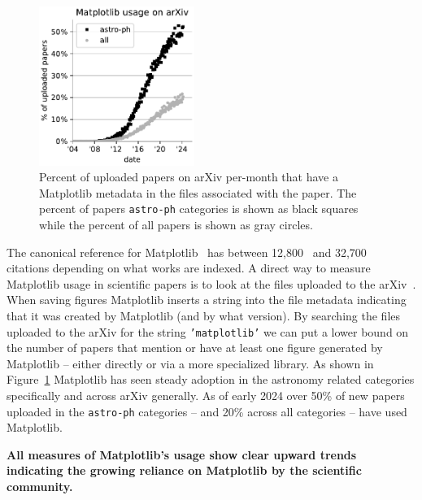 \documentclass[12pt]{article}
\numberwithin{page}{section}
\begin{document}
\begin{figure}
  \includegraphics[width=0.45\textwidth]{arXiv_usage}
  \caption{\small Percent of uploaded papers on arXiv per-month that have a Matplotlib
    metadata in the files associated with the paper.  The percent of papers
    \texttt{astro-ph} categories is shown as black squares while
    the percent of all papers is shown as gray circles.}
  \label{fig:arxiv}
\end{figure}


The canonical reference for
Matplotlib~\cite{Hunter:2007} has between 12,800~\cite{ads_mpl} and
32,700~\cite{gs_cites} citations depending on what works are indexed.  A direct
way to measure Matplotlib usage in scientific papers is to look at the files
uploaded to the arXiv~\cite{arxiv_stats}.  When saving figures Matplotlib
inserts a string into the file metadata indicating that it was created by
Matplotlib (and by what version).  By searching the files uploaded to the arXiv
for the string \texttt{'matplotlib'} we can put a lower bound
on the number of papers that mention or have at least one figure generated by
Matplotlib -- either directly or via a more specialized library.  As shown in
Figure~\ref{fig:arxiv} Matplotlib has seen steady adoption in the astronomy
related categories specifically and across arXiv generally.  As of early 2024
over 50\% of new papers uploaded in the \texttt{astro-ph} categories -- and
20\% across all categories -- have used Matplotlib.

\textbf{All measures of Matplotlib's usage show clear upward trends indicating the
growing reliance on Matplotlib by the scientific community.}
\end{document}
